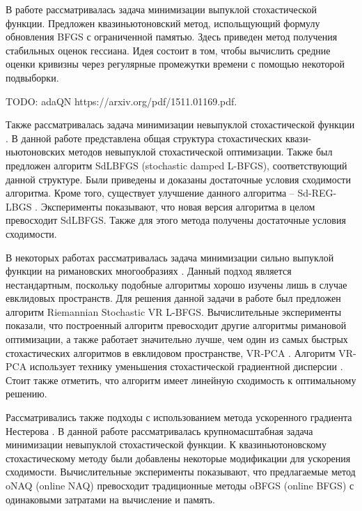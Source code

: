 \documentclass[]{scrartcl}
\begin{document}
В работе \cite{journals/siamjo/ByrdHNS16} рассматривалась задача минимизации выпуклой стохастической функции. Предложен квазиньютоновский метод, испольщующий формулу обновления BFGS с ограниченной памятью. Здесь приведен метод получения стабильных оценок гессиана. Идея состоит в том, чтобы вычислить средние оценки кривизны через регулярные промежутки времени с помощью некоторой подвыборки.

TODO: adaQN https://arxiv.org/pdf/1511.01169.pdf.


Также рассматривалась задача минимизации невыпуклой стохастической функции \cite{journals/siamjo/WangMGL17}. В данной работе представлена общая структура стохастических квази-ньютоновских методов невыпуклой стохастической оптимизации. Также был предложен алгоритм SdLBFGS (stochastic damped L-BFGS), соответствующий данной структуре. Были приведены и доказаны достаточные условия сходимости алгоритма. Кроме того, существует улучшение данного алгоритма -- Sd-REG-LBGS \cite{journals/corr/abs-1912-04456}. Эксперименты показывают, что новая версия алгоритма в целом превосходит SdLBFGS. Также для этого метода получены достаточные условия сходимости.

В некоторых работах рассматривалась задача минимизации сильно выпуклой функции на римановских многообразиях \cite{journals/corr/RoychowdhuryP17}. Данный подход является нестандартным, поскольку подобные алгоритмы хорошо изучены лишь в случае евклидовых пространств. Для решения данной задачи в работе был предложен алгоритм Riemannian Stochastic VR L-BFGS. Вычислительные эксперименты показали, что построенный алгоритм превосходит другие алгоритмы римановой оптимизации, а также работает значительно лучше, чем один из самых быстрых стохастических алгоритмов в евклидовом пространстве, VR-PCA \cite{journals/corr/Shamir14b}. Алгоритм VR-PCA использует технику уменьшения стохастической градиентной дисперсии \cite{oai:repository.ust.hk:1783.1-98257}.  Стоит также  отметить, что алгоритм имеет линейную сходимость к оптимальному решению. 

Рассматривались также подходы с использованием метода ускоренного градиента Нестерова \cite{journals/corr/abs-1909-03621}. В данной работе рассматривалась крупномасштабная задача минимизации невыпуклой стохастической функции. К квазиньютоновскому стохастическому методу были добавлены некоторые модификации для ускорения сходимости. Вычислительные эксперименты показывают, что предлагаемые метод oNAQ (online NAQ)  превосходит традиционные методы oBFGS (online BFGS) \cite{journals/jmlr/SchraudolphYG07} с одинаковыми затратами на вычисление и память.
\end{document}
